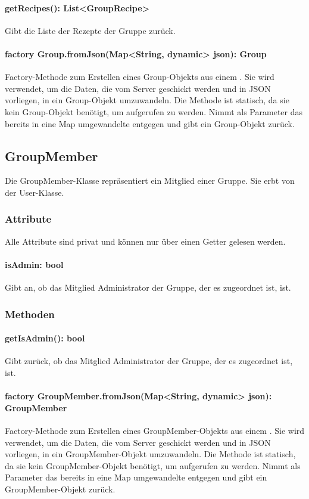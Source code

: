 \documentclass[parskip=full]{scrartcl}
\begin{document}
\paragraph{getRecipes(): List<GroupRecipe>}
Gibt die Liste der Rezepte der Gruppe zurück.
\paragraph{factory Group.fromJson(Map<String, dynamic> json): Group} Factory-Methode zum Erstellen eines Group-Objekts aus einem . Sie wird verwendet, um die Daten, die vom Server geschickt werden und in \Gls{JSON} vorliegen, in ein Group-Objekt umzuwandeln. Die Methode ist statisch, da sie kein Group-Objekt benötigt, um aufgerufen zu werden. Nimmt als Parameter das bereits in eine Map umgewandelte  entgegen und gibt ein Group-Objekt zurück.

\subsection{GroupMember}
Die GroupMember-Klasse repräsentiert ein Mitglied einer Gruppe. Sie erbt von der User-Klasse.
\subsubsection{Attribute}
Alle Attribute sind privat und können nur über einen Getter gelesen werden.
\paragraph{isAdmin: bool}
Gibt an, ob das Mitglied Administrator der Gruppe, der es zugeordnet ist, ist.
\subsubsection{Methoden}
\paragraph{getIsAdmin(): bool}
Gibt zurück, ob das Mitglied Administrator der Gruppe, der es zugeordnet ist, ist.
\paragraph{factory GroupMember.fromJson(Map<String, dynamic> json): GroupMember} Factory-Methode zum Erstellen eines GroupMember-Objekts aus einem . Sie wird verwendet, um die Daten, die vom Server geschickt werden und in \Gls{JSON} vorliegen, in ein GroupMember-Objekt umzuwandeln. Die Methode ist statisch, da sie kein GroupMember-Objekt benötigt, um aufgerufen zu werden. Nimmt als Parameter das bereits in eine Map umgewandelte  entgegen und gibt ein GroupMember-Objekt zurück.
\end{document}
